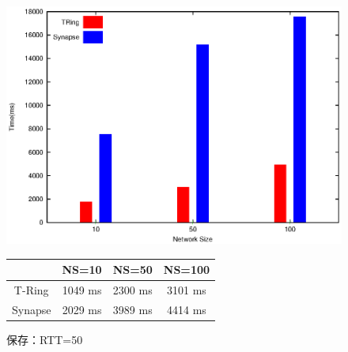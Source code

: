 \begin{figure}[htbp]
\begin{minipage}{1\textwidth}
    \centering
\includegraphics[width=14cm]{./images/compare_store_rtt50.eps}
\begin{center}
  \begin{tabular}{|c||c|c|c|} \hline
    \backslashbox{}{} & NS=10 & NS=50 & NS=100  \\ \hline \hline
       T-Ring & 1049 ms & 2300 ms & 3101 ms  \\ \hline
       Synapse & 2029  ms & 3989 ms & 4414 ms \\ \hline  \end{tabular}
  \label{tab:RTT=50}
\end{center}
\caption{保存：RTT=50}
\label{fig:compare_store_rtt50}
 \end{minipage}
\end{figure}

